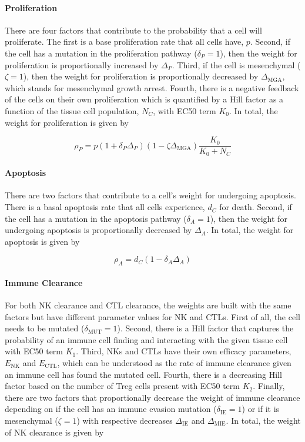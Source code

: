 \documentclass[11pt]{article}
\begin{document}
\paragraph{Proliferation}
There are four factors that contribute to the probability that a cell will proliferate.
The first is a base proliferation rate that all cells have, $p$.
Second, if the cell has a mutation in the proliferation pathway ($\delta_P=1$), then the weight for proliferation is proportionally increased by $\Delta_P$.
Third, if the cell is mesenchymal ($\zeta=1$), then the weight for proliferation is proportionally decreased by $\Delta_{\text{MGA}}$, which stands for mesenchymal growth arrest.
Fourth, there is a negative feedback of the cells on their own proliferation which is quantified by a Hill factor as a function of the tissue cell population, $N_C$, with EC50 term $K_0$.
In total, the weight for proliferation is given by

\begin{equation}\tag{2.1}
\rho_P = p(1+\delta_{P}\Delta_P)(1-\zeta \Delta_{\text{MGA}})\frac{K_0}{K_0+N_C}
\end{equation}

\paragraph{Apoptosis}
There are two factors that contribute to a cell's weight for undergoing apoptosis.
There is a basal apoptosis rate that all cells experience, $d_C$ for death.
Second, if the cell has a mutation in the apoptosis pathway ($\delta_A=1$), then the weight for undergoing apoptosis is proportionally decreased by $\Delta_A$.
In total, the weight for apoptosis is given by 

\begin{equation}\tag{2.2}
\rho_A = d_C(1-\delta_{A}\Delta_A)
\end{equation}

\paragraph{Immune Clearance}
For both NK clearance and CTL clearance, the weights are built with the same factors but have different parameter values for NK and CTLs.
First of all, the cell needs to be mutated ($\delta_{\text{MUT}}=1$).
Second, there is a Hill factor that captures the probability of an immune cell finding and interacting with the given tissue cell with EC50 term $K_1$.
Third, NKs and CTLs have their own efficacy parameters, $E_{\text{NK}}$ and $E_{\text{CTL}}$, which can be understood as the rate of immune clearance given an immune cell has found the mutated cell.
Fourth, there is a decreasing Hill factor based on the number of Treg cells present with EC50 term $K_2$.
Finally, there are two factors that proportionally decrease the weight of immune clearance depending on if the cell has an immune evasion mutation ($\delta_{\text{IE}}=1$) or if it is mesenchymal ($\zeta=1$) with respective decreases $\Delta_{\text{IE}}$ and $\Delta_{\text{MIE}}$.
In total, the weight of NK clearance is given by
\end{document}
